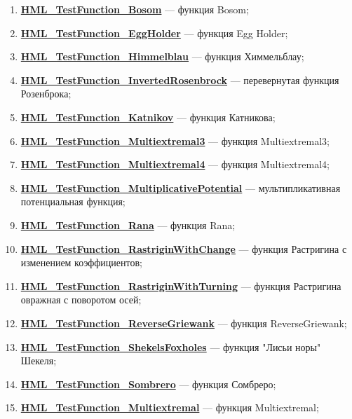 \begin{enumerate}
 \item \hyperref[TestFunctions:section:HML_TestFunction_Bosom]{\textbf{HML\_TestFunction\_Bosom}} --- функция Bosom;
 \item \hyperref[TestFunctions:section:HML_TestFunction_EggHolder]{\textbf{HML\_TestFunction\_EggHolder}} --- функция Egg Holder;
 \item \hyperref[TestFunctions:section:HML_TestFunction_Himmelblau]{\textbf{HML\_TestFunction\_Himmelblau}} --- функция Химмельблау;
 \item \hyperref[TestFunctions:section:HML_TestFunction_InvertedRosenbrock]{\textbf{HML\_TestFunction\_InvertedRosenbrock}} --- перевернутая функция Розенброка;
 \item \hyperref[TestFunctions:section:HML_TestFunction_Katnikov]{\textbf{HML\_TestFunction\_Katnikov}} --- функция Катникова;
 \item \hyperref[TestFunctions:section:HML_TestFunction_Multiextremal3]{\textbf{HML\_TestFunction\_Multiextremal3}} --- функция Multiextremal3;
 \item \hyperref[TestFunctions:section:HML_TestFunction_Multiextremal4]{\textbf{HML\_TestFunction\_Multiextremal4}} --- функция Multiextremal4;
 \item \hyperref[TestFunctions:section:HML_TestFunction_MultiplicativePotential]{\textbf{HML\_TestFunction\_MultiplicativePotential}} --- мультипликативная потенциальная функция;
 \item \hyperref[TestFunctions:section:HML_TestFunction_Rana]{\textbf{HML\_TestFunction\_Rana}} --- функция Rana;
 \item \hyperref[TestFunctions:section:HML_TestFunction_RastriginWithChange]{\textbf{HML\_TestFunction\_RastriginWithChange}} --- функция Растригина с изменением коэффициентов;
 \item \hyperref[TestFunctions:section:HML_TestFunction_RastriginWithTurning]{\textbf{HML\_TestFunction\_RastriginWithTurning}} --- функция Растригина овражная с поворотом осей;
 \item \hyperref[TestFunctions:section:HML_TestFunction_ReverseGriewank]{\textbf{HML\_TestFunction\_ReverseGriewank}} --- функция ReverseGriewank;
 \item \hyperref[TestFunctions:section:HML_TestFunction_ShekelsFoxholes]{\textbf{HML\_TestFunction\_ShekelsFoxholes}} --- функция "Лисьи норы" Шекеля;
 \item \hyperref[TestFunctions:section:HML_TestFunction_Sombrero]{\textbf{HML\_TestFunction\_Sombrero}} --- функция Сомбреро;
 \item \hyperref[TestFunctions:section:HML_TestFunction_Multiextremal]{\textbf{HML\_TestFunction\_Multiextremal}} --- функция Multiextremal;

\end{enumerate}
